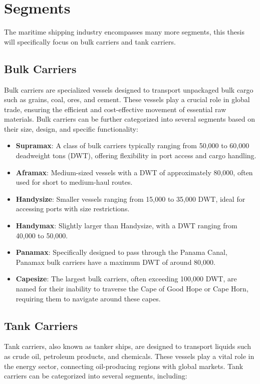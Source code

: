 \section{Segments}

The maritime shipping industry encompasses many more segments, this thesis will specifically focus on bulk carriers and tank carriers.

\subsection{Bulk Carriers}

Bulk carriers are specialized vessels designed to transport unpackaged bulk cargo such as grains, coal, ores, and cement. These vessels play a crucial role in global trade, ensuring the efficient and cost-effective movement of essential raw materials. Bulk carriers can be further categorized into several segments based on their size, design, and specific functionality:

\begin{itemize}
    \item \textbf{Supramax}: A class of bulk carriers typically ranging from 50,000 to 60,000 deadweight tons (DWT), offering flexibility in port access and cargo handling.
    \item \textbf{Aframax}: Medium-sized vessels with a DWT of approximately 80,000, often used for short to medium-haul routes.
    \item \textbf{Handysize}: Smaller vessels ranging from 15,000 to 35,000 DWT, ideal for accessing ports with size restrictions.
    \item \textbf{Handymax}: Slightly larger than Handysize, with a DWT ranging from 40,000 to 50,000.
    \item \textbf{Panamax}: Specifically designed to pass through the Panama Canal, Panamax bulk carriers have a maximum DWT of around 80,000.
    \item \textbf{Capesize}: The largest bulk carriers, often exceeding 100,000 DWT, are named for their inability to traverse the Cape of Good Hope or Cape Horn, requiring them to navigate around these capes.
\end{itemize}

\subsection{Tank Carriers}

Tank carriers, also known as tanker ships, are designed to transport liquids such as crude oil, petroleum products, and chemicals. These vessels play a vital role in the energy sector, connecting oil-producing regions with global markets. Tank carriers can be categorized into several segments, including:

